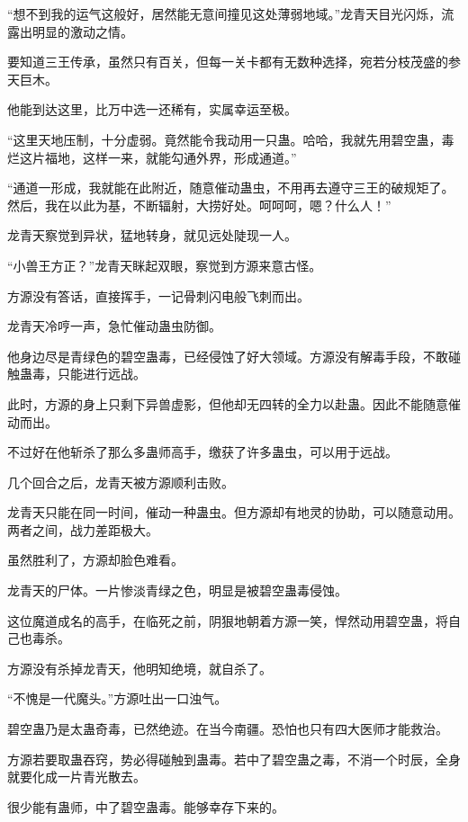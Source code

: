 
\begin{this_body}

“想不到我的运气这般好，居然能无意间撞见这处薄弱地域。”龙青天目光闪烁，流露出明显的激动之情。

要知道三王传承，虽然只有百关，但每一关卡都有无数种选择，宛若分枝茂盛的参天巨木。

他能到达这里，比万中选一还稀有，实属幸运至极。

“这里天地压制，十分虚弱。竟然能令我动用一只蛊。哈哈，我就先用碧空蛊，毒烂这片福地，这样一来，就能勾通外界，形成通道。”

“通道一形成，我就能在此附近，随意催动蛊虫，不用再去遵守三王的破规矩了。然后，我在以此为基，不断辐射，大捞好处。呵呵呵，嗯？什么人！”

龙青天察觉到异状，猛地转身，就见远处陡现一人。

“小兽王方正？”龙青天眯起双眼，察觉到方源来意古怪。

方源没有答话，直接挥手，一记骨刺闪电般飞刺而出。

龙青天冷哼一声，急忙催动蛊虫防御。

他身边尽是青绿色的碧空蛊毒，已经侵蚀了好大领域。方源没有解毒手段，不敢碰触蛊毒，只能进行远战。

此时，方源的身上只剩下异兽虚影，但他却无四转的全力以赴蛊。因此不能随意催动而出。

不过好在他斩杀了那么多蛊师高手，缴获了许多蛊虫，可以用于远战。

几个回合之后，龙青天被方源顺利击败。

龙青天只能在同一时间，催动一种蛊虫。但方源却有地灵的协助，可以随意动用。两者之间，战力差距极大。

虽然胜利了，方源却脸色难看。

龙青天的尸体。一片惨淡青绿之色，明显是被碧空蛊毒侵蚀。

这位魔道成名的高手，在临死之前，阴狠地朝着方源一笑，悍然动用碧空蛊，将自己也毒杀。

方源没有杀掉龙青天，他明知绝境，就自杀了。

“不愧是一代魔头。”方源吐出一口浊气。

碧空蛊乃是太蛊奇毒，已然绝迹。在当今南疆。恐怕也只有四大医师才能救治。

方源若要取蛊吞窍，势必得碰触到蛊毒。若中了碧空蛊之毒，不消一个时辰，全身就要化成一片青光散去。

很少能有蛊师，中了碧空蛊毒。能够幸存下来的。


\end{this_body}
